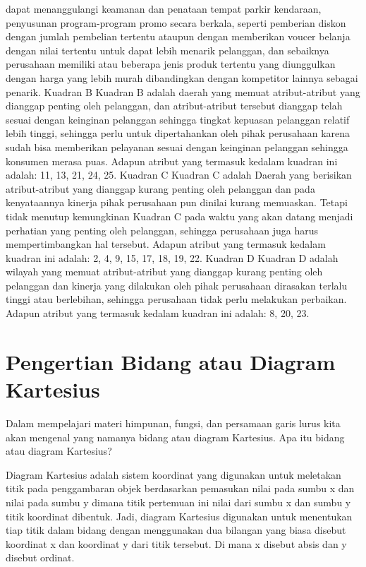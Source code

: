 dapat menanggulangi keamanan dan penataan tempat parkir kendaraan, penyusunan program-program promo secara berkala, seperti pemberian diskon dengan jumlah pembelian tertentu ataupun dengan
memberikan voucer belanja dengan nilai tertentu untuk dapat lebih menarik pelanggan, dan sebaiknya perusahaan memiliki atau beberapa jenis produk tertentu
yang diunggulkan dengan harga yang lebih murah dibandingkan dengan kompetitor lainnya sebagai penarik.
Kuadran B
Kuadran B adalah daerah yang memuat atribut-atribut yang dianggap penting oleh pelanggan, dan atribut-atribut tersebut dianggap telah sesuai dengan keinginan
pelanggan sehingga tingkat kepuasan pelanggan relatif lebih tinggi, sehingga perlu untuk dipertahankan oleh pihak perusahaan karena sudah bisa memberikan pelayanan
sesuai dengan keinginan pelanggan sehingga konsumen merasa puas. Adapun atribut yang termasuk kedalam kuadran ini adalah: 11, 13, 21, 24, 25.
Kuadran C
Kuadran C adalah Daerah yang berisikan atribut-atribut yang dianggap kurang penting oleh pelanggan dan pada kenyataannya kinerja pihak perusahaan pun dinilai kurang memuaskan. Tetapi tidak
menutup kemungkinan Kuadran C pada waktu yang akan datang menjadi perhatian yang penting oleh pelanggan, sehingga perusahaan juga harus mempertimbangkan
hal tersebut. Adapun atribut yang termasuk kedalam kuadran ini adalah: 2, 4, 9, 15, 17, 18, 19, 22.
Kuadran D
Kuadran D adalah wilayah yang memuat atribut-atribut yang dianggap kurang penting oleh pelanggan dan kinerja yang dilakukan oleh pihak perusahaan dirasakan
terlalu tinggi atau berlebihan, sehingga perusahaan tidak perlu melakukan perbaikan. Adapun atribut yang termasuk kedalam kuadran ini adalah: 8, 20, 23.

\section{Pengertian Bidang atau Diagram Kartesius}

Dalam mempelajari materi himpunan, fungsi, dan persamaan garis lurus kita akan mengenal yang namanya bidang atau diagram Kartesius. Apa itu bidang atau diagram Kartesius?

Diagram Kartesius adalah sistem koordinat yang digunakan untuk meletakan titik pada penggambaran objek berdasarkan pemasukan nilai pada sumbu x dan nilai pada sumbu y dimana titik pertemuan ini nilai dari sumbu x dan sumbu y titik koordinat dibentuk. Jadi, diagram Kartesius digunakan untuk menentukan tiap titik dalam bidang dengan menggunakan dua bilangan yang biasa disebut koordinat x dan koordinat y dari titik tersebut. Di mana x disebut absis dan y disebut ordinat.

